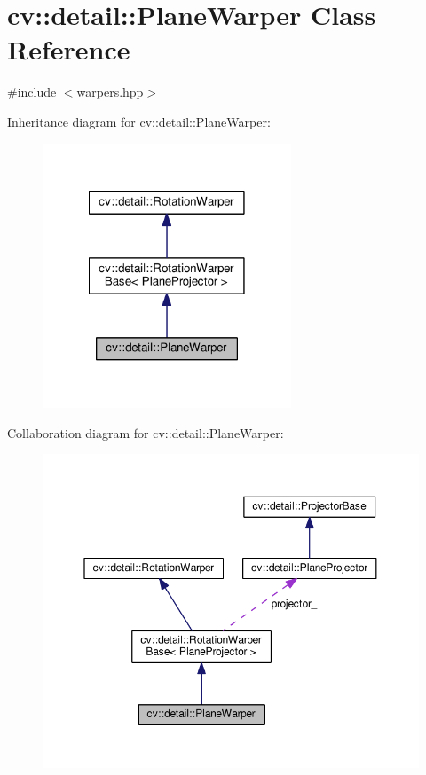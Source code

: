 \hypertarget{classcv_1_1detail_1_1PlaneWarper}{\section{cv\-:\-:detail\-:\-:Plane\-Warper Class Reference}
\label{classcv_1_1detail_1_1PlaneWarper}
}


{\ttfamily \#include $<$warpers.\-hpp$>$}



Inheritance diagram for cv\-:\-:detail\-:\-:Plane\-Warper\-:\nopagebreak
\begin{figure}[H]
\begin{center}
\leavevmode
\includegraphics[width=210pt]{classcv_1_1detail_1_1PlaneWarper__inherit__graph}
\end{center}
\end{figure}


Collaboration diagram for cv\-:\-:detail\-:\-:Plane\-Warper\-:\nopagebreak
\begin{figure}[H]
\begin{center}
\leavevmode
\includegraphics[width=350pt]{classcv_1_1detail_1_1PlaneWarper__coll__graph}
\end{center}
\end{figure}
